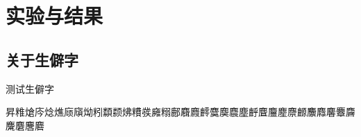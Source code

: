 \chapter{实验与结果}
\label{cha:experiment}

\section{关于生僻字}

测试生僻字

昇䊒熗庈焾燋庼廎㶭粌纇颣炥䊧彂㢕糑鄜麛麚䴫麌䴠麎塵䴣麆麠䴤麖䴨䴩䴪麘麞麡麍麏麐麔	
